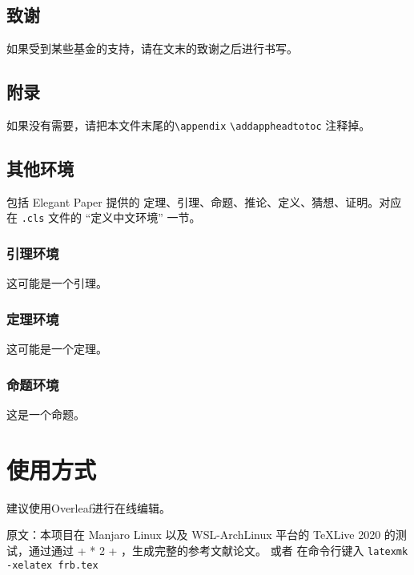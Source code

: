 \documentclass[lang=cn,12pt]{frbpaper}
\begin{document}
\subsection{致谢}

如果受到某些基金的支持，请在文末的致谢之后进行书写。

\subsection{附录}

如果没有需要，请把本文件末尾的\lstinline{\appendix} \lstinline{\addappheadtotoc} 注释掉。

\subsection{其他环境}

包括 Elegant Paper 提供的 定理、引理、命题、推论、定义、猜想、证明。对应在 \lstinline{.cls} 文件的 “定义中文环境” 一节。

\subsubsection{引理环境}


\begin{lemma}[一个引理]
    这可能是一个引理。
\end{lemma}


\subsubsection{定理环境}

\begin{theorem}[一个定理]
    这可能是一个定理。
\end{theorem}

\subsubsection{命题环境}

\begin{proposition}[一个命题]
    这是一个命题。
\end{proposition}

\section{使用方式}

建议使用Overleaf进行在线编辑。

原文：本项目在 Manjaro Linux 以及 WSL-ArchLinux 平台的 TeXLive 2020 的测试，通过通过  +  * 2 + ，生成完整的参考文献论文。
或者 在命令行键入 \lstinline{latexmk -xelatex frb.tex}
\end{document}
